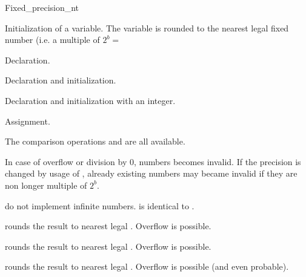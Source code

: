 \begin{ccClass} {Fixed_precision_nt}
\ccSetTwoColumns{}{\hspace*{8.5cm}}
\ccCreation
{}


            {Initialization of a variable. The variable is rounded to the
                nearest legal fixed number (i.e. a multiple of $2^b=$
                }


            {Declaration.}

            {Declaration and initialization.}


            {Declaration and initialization with an integer.}

\ccOperations
{}
        {Assignment. 
}

The comparison operations 
\ccStyle{==, !=, <, >, <=,} and \ccStyle{>=} are all available. 

{In case of overflow or division by 0, numbers becomes invalid.
If the precision is changed by usage of 
, already existing numbers may became invalid
if they are non longer multiple of $2^b$.}

{ \ccClassName do not implement infinite numbers. 
   is identical to .}


       {rounds the result to nearest legal . Overflow is possible.}

       {rounds the result to nearest legal . Overflow is possible.}

       {rounds the result to nearest legal . Overflow is possible (and even probable).}


\end{ccClass}
